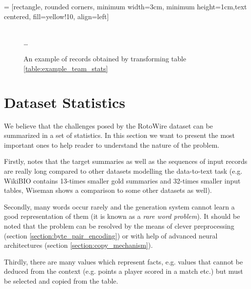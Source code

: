  = [rectangle, rounded corners, minimum width=3cm, minimum height=1cm,text centered, fill=yellow!10, align=left]

\begin{figure}[!h]
    \centering
    \usetikzlibrary{shapes.multipart}
    \\ \dots
    \caption{An example of records obtained by transforming table \ref{table:example_team_stats}} \label{figure:example_records}
\end{figure}

\section{Dataset Statistics} \label{assumptions_ref}

We believe that the challenges posed by the RotoWire dataset can be summarized in a set of statistics. In this section we want to present the most important ones to help reader to understand the nature of the problem. 

Firstly, \citet{wiseman2017} notes that the target summaries as well as the sequences of input records are really long compared to other datasets modelling the data-to-text task (e.g. WikiBIO \citep{lebret2016neural} contains 13-times smaller gold summaries and 32-times smaller input tables, Wiseman shows a comparison to some other datasets as well).

Secondly, many words occur rarely and the generation system cannot learn a good representation of them (it is known as a \emph{rare word problem}). It should be noted that the problem can be resolved by the means of clever preprocessing (section \ref{section:byte_pair_encoding}) or with help of advanced neural architectures (section \ref{section:copy_mechanism}).

Thirdly, there are many values which represent facts, e.g. values that cannot be deduced from the context (e.g. points a player scored in a match etc.) but must be selected and copied from the table.

